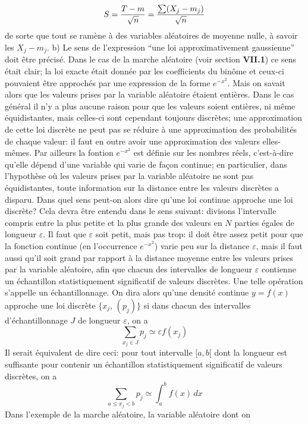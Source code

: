 $$S = {T - m \over \sqrt{n}} = {\sum (X_j - m_j) \over \sqrt{n}}$$
de sorte que tout se ram\`ene \`a des variables al\'eatoires de moyenne 
nulle, \`a savoir les $X_j - m_j$.
\smallskip
b) Le sens de l'expression ``une loi approximativement gaussienne''
doit
\^etre pr\'ecis\'e.  Dans le cas de la marche al\'eatoire
(voir section {\bf VII.1}) ce sens \'etait clair;  la loi exacte
\'etait donn\'ee par les coefficients du
bin\^ome et ceux-ci pouvaient
\^etre approch\'es par une expression de la forme $e^{-x^2}$. 
Mais on savait alors que les valeurs prises par la
variable al\'eatoire
\'etaient enti\`eres.  Dans le cas g\'en\'eral il n'y a
plus aucune
raison pour que les valeurs soient enti\`eres,  ni m\^eme
\'equidistantes, 
mais celles-ci sont cependant toujours discr\`etes;  une
approximation
de cette loi discr\`ete ne peut pas se r\'eduire \`a une
approximation des probabilit\'es de chaque valeur:  il faut en outre avoir
une approximation des valeurs elles-m\^emes.  Par ailleurs la fontion
$e^{-x^2}$ est d\'efinie sur les nombres r\'eels,  c'est-\`a-dire qu'elle
d\'epend d'une variable qui varie de fa\c{c}on continue;  en particulier,
dans l'hypoth\`ese o\`u les valeurs prises par la variable al\'eatoire ne
sont pas \'equidistantes,  toute information sur la distance entre les
valeurs discr\`etes a disparu.  Dans  quel sens peut-on alors dire qu'une
loi continue approche une loi discr\`ete? 
\medskip
Cela devra \^etre entendu dans le sens suivant:  divisons l'intervalle
compris entre la plus petite et la plus grande des valeurs en $N$ parties
\'egales de longueur $\varepsilon$.  Il faut que $\varepsilon$ soit petit,
mais pas trop:  il doit \^etre assez petit pour que la fonction continue (en
l'occurrence $e^{-x^2}$) varie peu sur la distance $\varepsilon$,  mais il
faut aussi qu'il soit grand par rapport \`a la distance moyenne entre les
valeurs prises par la variable al\'eatoire,  afin que chacun des
intervalles de longueur $\varepsilon$ contienne un \'echantillon
statistiquement significatif de valeurs discr\`etes.  Une telle
op\'eration s'appelle un \'echantillonnage.  On dira alors qu'une densit\'e 
continue $y = f(x)$ approche une loi discr\`ete $\{ x_j, \, (p_j) \}$ si
dans chacun des intervalles d'\'echantillonnage $J$ de longueur
$\varepsilon$, on a   
$$\sum_{x_j \in J} p_j \simeq \varepsilon f(x_j)$$ 
Il serait \'equivalent de dire ceci: pour tout intervalle $[a,b[$ dont la
longueur est suffisante pour contenir un \'echantillon statistiquement
significatif de valeurs discr\`etes, on a
$$\sum_{a \leq x_j < b} p_j \simeq \int_a^b f(x)\, dx$$ 
Dans l'exemple de la marche al\'eatoire, la variable al\'eatoire dont on
